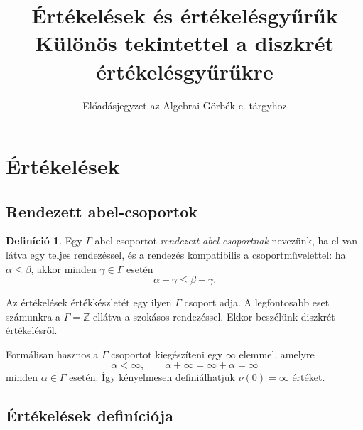 \documentclass[11pt,a4paper]{article}
\title{Értékelések és értékelésgyűrűk\\
\large Különös tekintettel a diszkrét értékelésgyűrűkre}
\author{Előadásjegyzet az Algebrai Görbék c. tárgyhoz}
\date{}
\theoremstyle{definition}
\newtheorem{definicio}[tetel]{Definíció}
\newcommand{\ZZ}{\mathbb Z}
\begin{document}
\maketitle
\tableofcontents

\section{Értékelések}

\subsection{Rendezett abel-csoportok}

\begin{definicio}
Egy $\Gamma$ abel-csoportot \emph{rendezett abel-csoportnak} nevezünk,
ha el van látva egy teljes rendezéssel, és a rendezés kompatibilis a
csoportművelettel: ha $\alpha\leq \beta$, akkor minden
$\gamma\in\Gamma$ esetén
\[
  \alpha+\gamma\leq \beta+\gamma.
\]
\end{definicio}





Az értékelések értékkészletét egy ilyen $\Gamma$ csoport
adja. A legfontosabb eset számunkra a $\Gamma=\ZZ$ ellátva a szokásos
rendezéssel. Ekkor beszélünk diszkrét értékelésről.

Formálisan hasznos a $\Gamma$ csoportot kiegészíteni egy $\infty$
elemmel, amelyre
\[
  \alpha < \infty,\qquad
  \alpha+\infty=\infty+\alpha=\infty
\]
minden $\alpha\in\Gamma$ esetén. Így kényelmesen definiálhatjuk
$
\nu(0)=\infty$ értéket.

\subsection{Értékelések definíciója}
\end{document}
